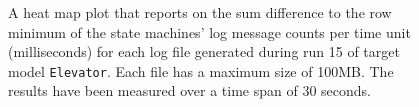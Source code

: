 \begin{figure}[htbp]
\centering
\begin{minipage}{1\textwidth}
  \centering
\end{minipage}
\caption{A heat map plot that reports on the sum difference to the row minimum of the state machines' log message counts per time unit (milliseconds) for each log file generated during run 15 of target model \texttt{Elevator}. Each file has a maximum size of 100MB. The results have been measured over a time span of 30 seconds.}
\label{figure:throughput_difference_elevator_15}
\end{figure}